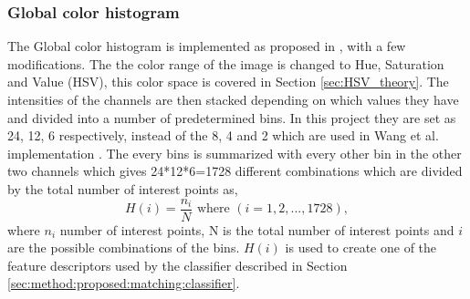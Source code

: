 \subsubsection{Global color histogram}
\label{sec:meth:featextr:gch}

The Global color histogram is implemented as proposed in \cite{wang2015new}, with a few modifications. The the color range of the image is changed to Hue, Saturation and Value (HSV), this color space is covered in Section \ref{sec:HSV_theory}. The intensities of the channels are then stacked depending on which values they have and divided into a number of predetermined bins. In this project they are set as 24, 12, 6 respectively, instead of the 8, 4 and 2 which are used in Wang et al. implementation \cite{wang2015new}. The every bins is summarized with every other bin in the other two channels which gives 24*12*6=1728 different combinations which are divided by the total number of interest points as,
\begin{equation}
H(i) = \frac{n_i}{N} \mbox{ where } (i = 1, 2, ..., 1728),
\end{equation}
where $n_i$ number of interest points, N is the total number of interest points and $i$ are the possible combinations of the bins. $H(i)$ is used to create one of the feature descriptors used by the classifier described in Section \ref{sec:method:proposed:matching:classifier}.


